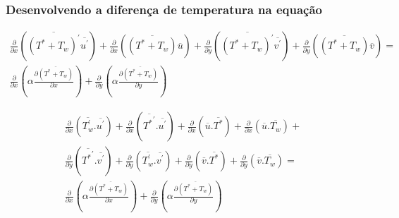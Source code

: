\documentclass[xcolor=dvipsnames,10pt,aspectratio=169]{beamer}
\begin{document}
		
		\begin{frame}
		\frametitle{Desenvolvendo a diferença de temperatura na equação}
		\begin{equation}
		\begin{split}
		\frac{\partial{}}{\partial{x}} \left(\overline{(T^\ast + T_w)^\prime} \overline{ u^\prime}\right) + \frac{\partial{}}{\partial{x}}\left(\overline{(T^\ast + T_w)} \overline{u}\right)+ 
		\frac{\partial{}}{\partial{y}} \left(\overline{(T^\ast + T_w)^\prime} \overline{ v^\prime}\right) + \frac{\partial{}}{\partial{y}}\left(\overline{(T^\ast + T_w)} \overline{v}\right) = \\
		{\frac{\partial{}}{\partial{x}}} \left(\alpha {\frac{\partial{\overline{(T^\ast + T_w)}}}{\partial{x}}} \right) +
		{\frac{\partial{}}{\partial{y}}} \left(\alpha {\frac{\partial{\overline{(T^\ast + T_w)}}}{\partial{y}}} \right) 
		\end{split}
		\end{equation}
		\begin{center}\begin{equation}\begin{split}\label{oi}
		\frac{\partial{}}{\partial{x}} \left(\overline{T_w^{\prime} }. \overline{ u^{\prime}}\right) +\frac{\partial{}}{\partial{x}} \left(\overline{{T^{\ast}}^{\prime}}. \overline{ u^{\prime}}\right)
		+\frac{\partial{}}{\partial{x}}\left(\overline{u}. \overline{T^{\ast}}\right)+ 
		\frac{\partial{}}{\partial{x}}\left(\overline{u}. \overline{T_w}\right)+ 
		\\
		\frac{\partial{}}{\partial{y}} \left(\overline{{T^{\ast}}^{\prime}}. \overline{ v^{\prime}}\right)+
		\frac{\partial{}}{\partial{y}} \left(\overline{T_w^\prime}. \overline{ v^\prime}\right) + \frac{\partial{}}{\partial{y}}\left(\overline{v}. \overline{T^\ast}\right) +
		\frac{\partial{}}{\partial{y}}\left(\overline{v}. \overline{T_w}\right) 
		= 
		\\
		{\frac{\partial{}}{\partial{x}}} \left(\alpha {\frac{\partial{\overline{(T^\ast + T_w)}}}{\partial{x}}} \right) +
		{\frac{\partial{}}{\partial{y}}} \left(\alpha {\frac{\partial{\overline{(T^\ast + T_w)}}}{\partial{y}}} \right) 
		\end{split}\end{equation}\end{center}
		\end{frame}
		
		
		
		
		
\end{document}
